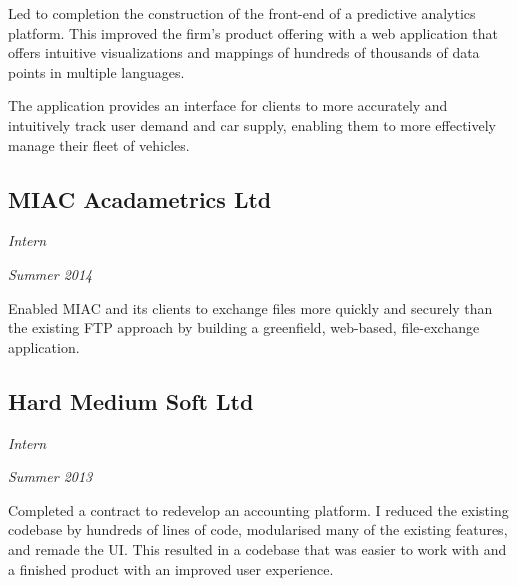 Led to completion the construction of the front-end of a predictive analytics
platform. This improved the firm's product offering with a web application that
offers intuitive visualizations and mappings of hundreds of thousands of data
points in multiple languages.

The application provides an interface for clients to more accurately and
intuitively track user demand and car supply, enabling them to more effectively
manage their fleet of vehicles.

\subsection*{MIAC Acadametrics Ltd}
\noindent\begin{minipage}[b]{0.5\textwidth}
  \flushleft
  \emph{Intern}
\end{minipage}
\noindent\begin{minipage}[b]{0.5\textwidth}
  \flushright
  \emph{Summer 2014}
\end{minipage}

Enabled MIAC and its clients to exchange files more quickly and securely than
the existing FTP approach by building a greenfield, web-based, file-exchange
application.

\subsection*{Hard Medium Soft Ltd}
\noindent\begin{minipage}[b]{0.5\textwidth}
  \flushleft
  \emph{Intern}
\end{minipage}
\noindent\begin{minipage}[b]{0.5\textwidth}
  \flushright
  \emph{Summer 2013}
\end{minipage}

Completed a contract to redevelop an accounting platform. I reduced the existing
codebase by hundreds of lines of code, modularised many of the existing
features, and remade the UI. This resulted in a codebase that was easier to work
with and a finished product with an improved user experience.

